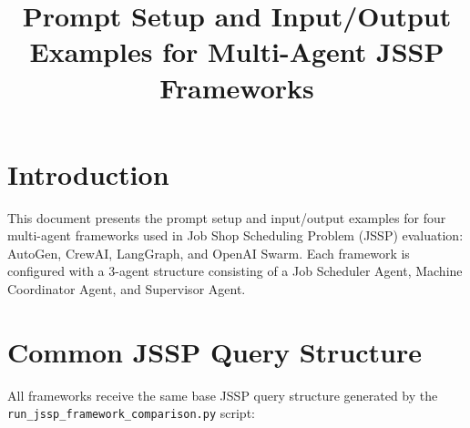 \documentclass[11pt]{article}
\title{Prompt Setup and Input/Output Examples for Multi-Agent JSSP Frameworks}
\author{}
\date{}
\begin{document}
\maketitle

\section{Introduction}

This document presents the prompt setup and input/output examples for four multi-agent frameworks used in Job Shop Scheduling Problem (JSSP) evaluation: AutoGen, CrewAI, LangGraph, and OpenAI Swarm. Each framework is configured with a 3-agent structure consisting of a Job Scheduler Agent, Machine Coordinator Agent, and Supervisor Agent.

\section{Common JSSP Query Structure}

All frameworks receive the same base JSSP query structure generated by the \texttt{run\_jssp\_framework\_comparison.py} script:
\end{document}
